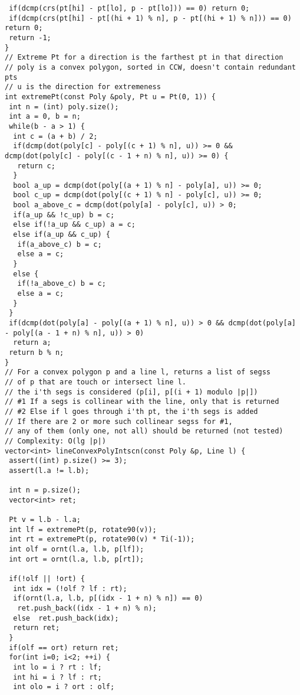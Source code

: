 \documentclass[a4paper,11pt,oneside]{article}
\begin{document}
\begin{multicols*}{\COLS}
\begin{lstlisting}
 if(dcmp(crs(pt[hi] - pt[lo], p - pt[lo])) == 0) return 0;
 if(dcmp(crs(pt[hi] - pt[(hi + 1) % n], p - pt[(hi + 1) % n])) == 0) return 0;
 return -1;
}
// Extreme Pt for a direction is the farthest pt in that direction
// poly is a convex polygon, sorted in CCW, doesn't contain redundant pts
// u is the direction for extremeness
int extremePt(const Poly &poly, Pt u = Pt(0, 1)) {
 int n = (int) poly.size();
 int a = 0, b = n;
 while(b - a > 1) {
  int c = (a + b) / 2;
  if(dcmp(dot(poly[c] - poly[(c + 1) % n], u)) >= 0 && dcmp(dot(poly[c] - poly[(c - 1 + n) % n], u)) >= 0) {
   return c;
  }
  bool a_up = dcmp(dot(poly[(a + 1) % n] - poly[a], u)) >= 0;
  bool c_up = dcmp(dot(poly[(c + 1) % n] - poly[c], u)) >= 0;
  bool a_above_c = dcmp(dot(poly[a] - poly[c], u)) > 0;
  if(a_up && !c_up) b = c;
  else if(!a_up && c_up) a = c;
  else if(a_up && c_up) {
   if(a_above_c) b = c;
   else a = c;
  }
  else {
   if(!a_above_c) b = c;
   else a = c;
  }
 }
 if(dcmp(dot(poly[a] - poly[(a + 1) % n], u)) > 0 && dcmp(dot(poly[a] - poly[(a - 1 + n) % n], u)) > 0)
  return a;
 return b % n;
}
// For a convex polygon p and a line l, returns a list of segss
// of p that are touch or intersect line l.
// the i'th segs is considered (p[i], p[(i + 1) modulo |p|])
// #1 If a segs is collinear with the line, only that is returned
// #2 Else if l goes through i'th pt, the i'th segs is added
// If there are 2 or more such collinear segss for #1,
// any of them (only one, not all) should be returned (not tested)
// Complexity: O(lg |p|)
vector<int> lineConvexPolyIntscn(const Poly &p, Line l) {
 assert((int) p.size() >= 3);
 assert(l.a != l.b);

 int n = p.size();
 vector<int> ret;

 Pt v = l.b - l.a;
 int lf = extremePt(p, rotate90(v));
 int rt = extremePt(p, rotate90(v) * Ti(-1));
 int olf = ornt(l.a, l.b, p[lf]);
 int ort = ornt(l.a, l.b, p[rt]);

 if(!olf || !ort) {
  int idx = (!olf ? lf : rt);
  if(ornt(l.a, l.b, p[(idx - 1 + n) % n]) == 0)
   ret.push_back((idx - 1 + n) % n);
  else  ret.push_back(idx);
  return ret;
 }
 if(olf == ort) return ret;
 for(int i=0; i<2; ++i) {
  int lo = i ? rt : lf;
  int hi = i ? lf : rt;
  int olo = i ? ort : olf;


\end{lstlisting}
\end{multicols*}
\end{document}
